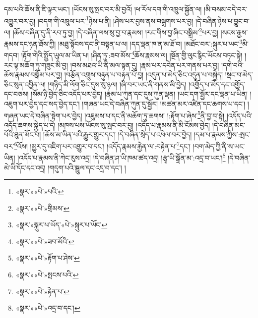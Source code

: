 དམ་པའི་ཆོས་ནི་ཇི་ལྟར་ཡང་། །ཡོངས་སུ་སྤང་བར་མི་བྱའོ། །ཕ་རོལ་དག་གི་འཁྲུལ་སྐྱོན་ལ། །མི་བསམ་བདེ་བར་འགྱུར་བར་བྱ། །བདག་གི་འཁྲུལ་པར་\footnote{«སྣར་»«པེ་»པའི་}ཉེས་པ་ནི། །ཤེས་པར་བྱས་ནས་བསྒྲགས་པར་བྱ། །དེ་བཞིན་ཉེས་པ་བྱུང་བ་ལ། །ཆོས་བཞིན་དུ་ནི་རབ་ཏུ་བྱ། །དེ་བཞིན་ལས་སུ་བྱ་བ་རྣམས། །རང་གིས་བྱ་ཞིང་བསྒྲིམ་\footnote{«སྣར་»«པེ་»གྲིམས་}པར་བྱ། །སངས་རྒྱས་རྣམས་དང་ཉན་ཐོས་ཀྱི། །མཐུ་སྟོབས་དང་ནི་བསྟན་པ་ལ། །དད་ལྡན་ཁ་ན་མ་ཐོ་བ། །མཐོང་བར་:སྐུར་པ་ཡང་\footnote{«སྣར་»སྐུར་པ་ཡོད་«པེ་»སྐུར་པ་ཡོང་}མི་གདབ། །རྟོག་གེའི་སྤྱོད་ཡུལ་མ་ཡིན་པ། །ཤིན་ཏུ་:ཟབ་མོས་\footnote{«སྣར་»«པེ་»ཟབ་མོའི་}ཆོས་རྣམས་ལ། །སྔོན་གྱི་ལུང་རྙིང་ཡོངས་བཏང་སྟེ། །རང་ལྟ་མཆོག་ཏུ་གཟུང་མི་བྱ། །བས་མཐའ་ཡི་ནི་མལ་སྟན་དུ། །རྣམ་པར་དབེན་པར་གནས་པར་བྱ། །དགེ་བའི་ཆོས་རྣམས་བསྒོམ་པར་བྱ། །བརྩོན་འགྲུས་བརྟུན་པ་བརྟན་པོ་བྱ། །འདུན་པ་མེད་ཅིང་འདུན་པ་བསྐྱེད། །སྡང་བ་མེད་ཅིང་སུན་འབྱིན་ལ། །གཉིད་མི་ལོག་ཅིང་དུས་སུ་ཉལ། །ཞི་བར་ཡང་ནི་གནས་མི་བྱེད། །འགྱོད་པ་མེད་དང་འགྱོད་དང་བཅས། །སོམ་ཉི་བྱེད་ཅིང་འདོད་པར་བྱེད། །རྣམ་པ་ཀུན་དང་དུས་ཀུན་ལྡན། །ཡང་དག་སྦྱོར་དང་ལྡན་པ་ཡིན། །འཇུག་པར་བྱེད་དང་སད་བྱེད་དང་། །གཞན་ཡང་དེ་བཞིན་ཀུན་དུ་སྦྱོར། །མཚན་མར་འཛིན་དང་ཆགས་པ་དང་། །གཞན་ཡང་དེ་བཞིན་སྟེག་པར་བྱེད། །འཇུམས་པ་དང་ནི་མཆོག་ཏུ་ཆགས། །:རྟོག་པ་ཞེས་\footnote{«སྣར་»«པེ་»རྟོག་པ་ཤེས་}ནི་བྱ་བ་སྟེ། །འདོད་པའི་འདོད་ཆགས་སྐྱེད་པ་དེ། །མཁས་པས་ཡོངས་སུ་སྤང་བར་བྱ། །འདོད་པ་རྣམས་ནི་མི་ངོམས་བྱེད། །དེ་བཞིན་མང་པོའི་ཐུན་མོང་བ། །ཆོས་མ་ཡིན་པའི་རྒྱུར་གྱུར་དང་། །དེ་བཞིན་སྲེད་པ་འཕེལ་བར་བྱེད། །དམ་པ་རྣམས་ཀྱིས་:སྤང་བར་\footnote{«སྣར་»«པེ་»སྤངས་པའི་}འོས། །མྱུར་དུ་འཇིག་པར་འགྱུར་བ་དང་། །འདོད་རྣམས་རྐྱེན་ལ་:བརྟེན་པ་\footnote{«སྣར་»«པེ་»རྟེན་པ་}དང་། །བག་མེད་ཀྱི་ནི་ས་ཡང་ཡིན། །འདོད་པ་རྣམས་ནི་ཀེང་རུས་འདྲ། །དེ་བཞིན་ཤ་ཡི་ཁམ་ཚད་འདྲ། །རྩྭ་ཡི་སྒྲོན་མ་:འདྲ་བ་ཡང་།\footnote{«སྣར་»«པེ་»འདྲ་བ་དང་།} །དེ་བཞིན་མེ་ཡི་དོང་དང་འདྲ། །གདུག་པའི་སྦྲུལ་དང་འདྲ་བ་དང་། །
